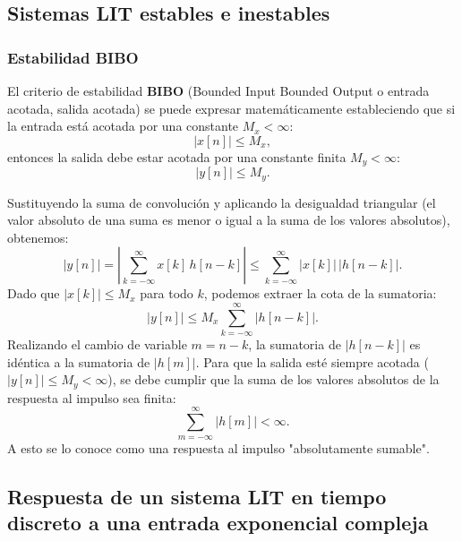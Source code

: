 \documentclass[11pt,a4paper,openany]{book}
\begin{document}
\subsection{Sistemas LIT estables e inestables}

\subsubsection{Estabilidad BIBO}

El criterio de estabilidad \textbf{BIBO} (Bounded Input Bounded Output o entrada acotada, salida acotada) se puede expresar matemáticamente estableciendo que si la entrada está acotada por una constante $M_x < \infty$:
\begin{equation}
	|x[n]| \leq M_{x},
\end{equation}
entonces la salida debe estar acotada por una constante finita $M_y < \infty$:
\begin{equation}
	|y[n]| \leq M_{y}.
\end{equation}

Sustituyendo la suma de convolución y aplicando la desigualdad triangular (el valor absoluto de una suma es menor o igual a la suma de los valores absolutos), obtenemos:
\begin{equation}
	|y[n]| = \left| \sum_{k=-\infty}^{\infty} x[k] \, h[n-k] \right| \leq \sum_{k=-\infty}^{\infty} |x[k]| \, |h[n-k]|.
\end{equation}
Dado que $|x[k]| \leq M_x$ para todo $k$, podemos extraer la cota de la sumatoria:
\begin{equation}
	|y[n]| \leq M_{x} \sum_{k=-\infty}^{\infty} |h[n-k]|.
\end{equation}
Realizando el cambio de variable $m = n-k$, la sumatoria de $|h[n-k]|$ es idéntica a la sumatoria de $|h[m]|$. Para que la salida esté siempre acotada ($|y[n]| \leq M_{y} < \infty$), se debe cumplir que la suma de los valores absolutos de la respuesta al impulso sea finita:
\begin{equation}
	\sum_{m=-\infty}^{\infty} |h[m]| < \infty.
\end{equation}
A esto se lo conoce como una respuesta al impulso "absolutamente sumable".

\subsection{Respuesta de un sistema LIT en tiempo discreto a una entrada exponencial compleja}
\end{document}

